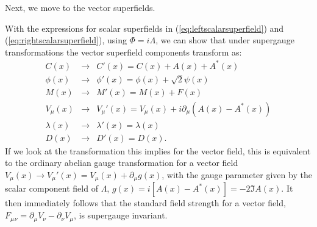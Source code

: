 \documentclass[notes.tex]{subfiles}
\begin{document}
Next, we move to the vector superfields.


With the expressions for scalar superfields in (\ref{eq:leftscalarsuperfield}) and (\ref{eq:rightscalarsuperfield}), using $\Phi=i\Lambda$, we can show that under supergauge transformations the vector superfield components transform as:
\begin{eqnarray}
C(x) &\to& C'(x) = C(x) + A(x) + A^*(x)\\
\phi(x) &\to& \phi'(x) = \phi(x) + \sqrt{2}\psi(x)\\
M(x) &\to& M'(x) = M(x) + F(x)\\
V_\mu(x) &\to& V_\mu'(x) = V_\mu(x) +i\partial_\mu(A(x) - A^*(x))\\
\lambda(x) &\to& \lambda'(x) = \lambda(x)\\
D(x) &\to& D'(x) = D(x). \label{eq:supergaugetrans_Dterm}
\end{eqnarray}
If we look at the transformation this implies for the vector field, this is equivalent to the ordinary abelian gauge transformation for a vector field  $V_\mu(x)\to V_\mu'(x) = V_\mu(x) +\partial_\mu g(x)$, with the gauge parameter given by the scalar component field of $\Lambda$, $g(x)=i[A(x) - A^*(x)]=-2\Im{A(x)}$. It then immediately follows that the standard field strength for a vector field, $F_\mu{}_\nu = \partial_\mu V_\nu - \partial_\nu V_\mu$, is supergauge invariant. 
\end{document}

